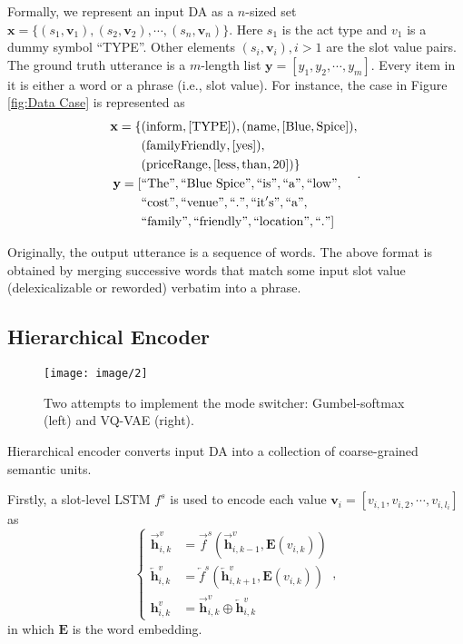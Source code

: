 \documentclass[letterpaper]{article} %
\begin{document}
	Formally, we represent an input DA as a $n$-sized set $\mathbf{x} = \{(s_1, \mathbf{v}_1), (s_2, \mathbf{v}_2), \cdots, (s_{n}, \mathbf{v}_n)\}$. Here $s_1$ is the act type and $v_1$ is a dummy symbol ``TYPE''. Other elements $(s_i, \mathbf{v}_i), i > 1$ are the slot value pairs. The ground truth utterance is a $m$-length list $\mathbf{y} = [y_1, y_2, \cdots, y_m]$. Every item in it is either a word or a phrase (i.e., slot value). For instance, the case in Figure \ref{fig:Data Case} is represented as
	\begin{equation} \nonumber
	\begin{aligned}
	\mathbf{x} = \{ & (\mathrm{inform}, [\mathrm{TYPE}]), (\mathrm{name}, [\mathrm{Blue}, \mathrm{Spice}]), \\
	& (\mathrm{familyFriendly}, [\mathrm{yes}]), \\
	&  (\mathrm{priceRange}, [\mathrm{less}, \mathrm{than}, \mathrm{20}]) \} \\
	\mathbf{y} = [& ``\mathrm{The}", ``\mathrm{Blue~Spice}",`` \mathrm{is}", ``\mathrm{a}", ``\mathrm{low}", \\
	& ``\mathrm{cost}", ``\mathrm{venue}", ``\mathrm{.}", ``\mathrm{it's}",``\mathrm{a}", \\
	& ``\mathrm{family}", ``\mathrm{friendly}", ``\mathrm{location}", ``\mathrm{.}"]
	\end{aligned}.
	\end{equation}

	Originally, the output utterance is a sequence of words. The above format is obtained by merging successive words that match some input slot value (delexicalizable or reworded) verbatim into a phrase.

\subsection{Hierarchical Encoder}

	\begin{figure*}
		\centering
		\texttt{[image: image/2]}

		\caption{Two attempts to implement the mode switcher: Gumbel-softmax (left) and VQ-VAE (right).}
		\label{fig:Mode Switcher}
	\end{figure*}

	Hierarchical encoder converts input DA into a collection of coarse-grained semantic units.

	Firstly, a slot-level LSTM $f^{s}$ is used to encode each value $\mathbf{v}_i = [v_{i, 1}, v_{i, 2}, \cdots, v_{i, l_i}]$ as
	\begin{equation}
	\left\{\begin{aligned}
	\overrightarrow{\mathbf{h}}_{i,k}^v & = \overrightarrow{f}^s(\overrightarrow{\mathbf{h}}_{i,k-1}^v, \mathbf{E}(v_{i, k})) \\
	\overleftarrow{\mathbf{h}}_{i,k}^v & = \overleftarrow{f}^s(\overleftarrow{\mathbf{h}}_{i,k+1}^v, \mathbf{E}(v_{i, k})) \\
	\mathbf{h}_{i,k}^v & = \overrightarrow{\mathbf{h}}_{i,k}^v \oplus \overleftarrow{\mathbf{h}}_{i,k}^v
	\end{aligned}\right.,
	\end{equation}
	in which $\mathbf{E}$ is the word embedding.
\end{document}
